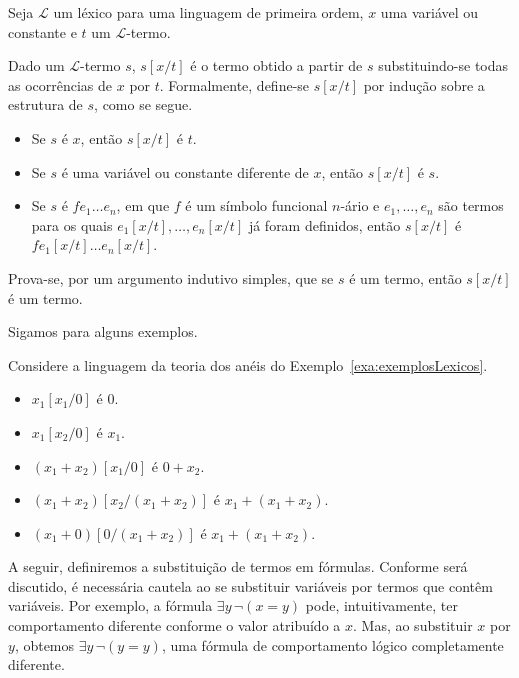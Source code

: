 \begin{metadefinition}\label{mdef:substituicaoEmTermos}
    Seja $\mathcal L$ um léxico para uma linguagem de primeira ordem, $x$ uma variável ou constante e $t$ um $\mathcal L$-termo.

    Dado um $\mathcal L$-termo $s$, $s[x/t]$ é o termo obtido a partir de $s$ substituindo-se todas as ocorrências de $x$ por $t$.
    Formalmente, define-se $s[x/t]$ por indução sobre a estrutura de $s$, como se segue.
    \begin{itemize}
        \item Se $s$ é $x$, então $s[x/t]$ é $t$.
        \item Se $s$ é uma variável ou constante diferente de $x$, então $s[x/t]$ é $s$.
        \item Se $s$ é $fe_1 \dots e_n$, em que $f$ é um símbolo funcional $n$-ário e $e_1, \dots, e_n$ são termos para os quais $e_1[x/t], \dots, e_n[x/t]$ já foram definidos, então $s[x/t]$ é $fe_1[x/t] \dots e_n[x/t]$.
    \end{itemize}
\end{metadefinition}
Prova-se, por um argumento indutivo simples, que se $s$ é um termo, então $s[x/t]$ é um termo.


Sigamos para alguns exemplos.

\begin{example}\label{exa:substituicaoEmTermos}
    Considere a linguagem da teoria dos anéis do Exemplo~\ref{exa:exemplosLexicos}.
    \begin{itemize}
        \item $x_1[x_1/0]$ é $0$.
        \item $x_1[x_2/0]$ é $x_1$.
        \item $(x_1 + x_2)[x_1/0]$ é $0 + x_2$.
        \item $(x_1 + x_2)[x_2/(x_1 + x_2)]$ é $x_1 + (x_1 + x_2)$.
        \item $(x_1 + 0)[0/(x_1 + x_2)]$ é $x_1 + (x_1 + x_2)$.
    \end{itemize}
\end{example}

A seguir, definiremos a substituição de termos em fórmulas.
Conforme será discutido, é necessária cautela ao se substituir variáveis por termos que contêm variáveis.
Por exemplo, a fórmula $\exists y \, \neg(x = y)$ pode, intuitivamente, ter comportamento diferente conforme o valor atribuído a $x$.
Mas, ao substituir $x$ por $y$, obtemos $\exists y \, \neg(y = y)$, uma fórmula de comportamento lógico completamente diferente.

